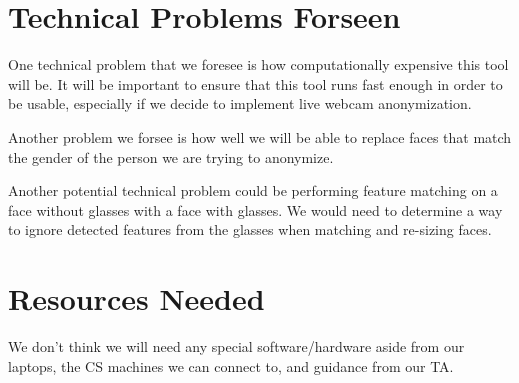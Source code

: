 \section*{Technical Problems Forseen}

One technical problem that we foresee is how computationally expensive this tool will be. It will be important to ensure that this tool runs fast enough in order to be usable, especially if we decide to implement live webcam anonymization.

Another problem we forsee is how well we will be able to replace faces that match the gender of the person we are trying to anonymize.

Another potential technical problem could be performing feature matching on a face without glasses with a face with glasses. We would need to determine a way to ignore detected features from the glasses when matching and re-sizing faces.

\section*{Resources Needed}

We don't think we will need any special software/hardware aside from our laptops, the CS machines we can connect to, and guidance from our TA.


